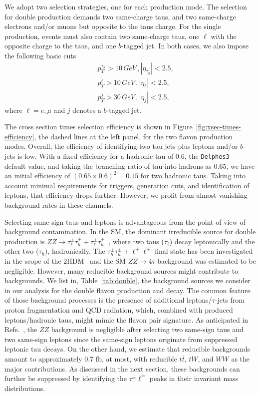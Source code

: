 \documentclass[prd,amsfonts,onecolumn,superscriptaddress,aps,nofootinbib,11pt]{revtex4-1}
\begin{document}
We adopt two selection strategies, one for each production mode. The selection for double production demands two same-charge taus, and two same-charge electrons and/or muons but opposite to the taus charge.  For the single production, events must also contain two same-charge taus, one $\ell$ with the opposite charge to the taus, and one $b$-tagged jet.  In both cases, we also impose the following basic cuts %
\begin{eqnarray}
    && p_T^{\tau_h}  > 10 \, \si{GeV} \,, \left| \eta_{\tau_h} \right| < 2.5, \nonumber \\
    && p_T^{\ell}  > 10 \, \si{GeV} \,, \left| \eta_{\ell} \right| < 2.5, \nonumber \\
    && p_T^{j} >  30 \, \si{GeV} \,, \left| \eta_j \right| <  2.5, 
    \label{eq:basic_cuts}
\end{eqnarray}
where $\ell = e, \mu$ and $j$ denotes a $b$-tagged jet.

 The cross section times selection efficiency is shown in Figure~\ref{fig:xsec-times-efficiency}, the dashed lines at the left panel, for the two flavon production modes. Overall, the efficiency of identifying two tau jets plus leptons and/or $b$-jets is low. With a fixed efficiency for a hadronic tau of 0.6, the \texttt{Delphes3}~\cite{deFavereau:2013fsa} default value, and taking the branching ratio of tau into hadrons as 0.65, we have an initial efficiency of $(0.65\times 0.6)^2=0.15$ for two hadronic taus. Taking into account minimal requirements for triggers, generation cuts, and identification of leptons, that efficiency drops further. However, we profit from almost vanishing background rates in these channels.

 Selecting same-sign taus and leptons is advantageous from the point of view of background contamination. In the SM, the dominant irreducible source for double production is $ZZ\to \tau_\ell^\pm\tau_h^\mp+\tau_\ell^\pm\tau_h^\mp$~, where two taus ($\tau_\ell$) decay leptonically and the other two ($\tau_h)$, hadronically.   The $\tau_h^\pm\tau_h^\pm+\ell^\mp\ell^\mp$ final state has been investigated in the scope of the 2HDM~\cite{Iguro:2019sly,Blanke:2022kpi} and the SM $ZZ\to 4\tau$ background was estimated to be negligible. However, many reducible background sources might contribute to backgrounds. We list in, Table~\ref{tab:double}, the background sources we consider in our analysis for the double flavon production and decay. The common feature of those background processes is the presence of additional leptons/$\tau$-jets from proton fragmentation and QCD radiation, which, combined with produced leptons/hadronic taus, might mimic the flavon pair signature. As anticipated in Refs.~\cite{Iguro:2019sly,Blanke:2022kpi}, the $ZZ$ background is negligible after selecting two same-sign taus and two same-sign leptons since the same-sign leptons originate from suppressed leptonic tau decays. On the other hand, we estimate that reducible backgrounds amount to approximately 0.7 fb, at most, with reducible $t\bar{t}$, $tW$, and $WW$ as the major contributions. As discussed in the next section, these backgrounds can further be suppressed by identifying the $\tau^\pm\ell^\mp$ peaks in their invariant mass distributions.
\end{document}
